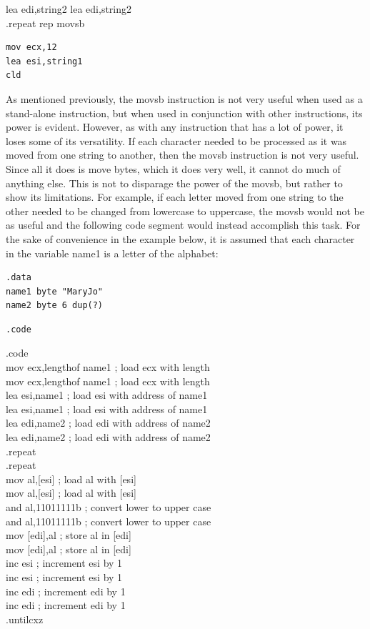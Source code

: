 \documentclass[10pt]{article}
\begin{document}
lea edi,string2 lea edi,string2\\
.repeat rep movsb

\begin{verbatim}
mov ecx,12
lea esi,string1
cld
\end{verbatim}

As mentioned previously, the movsb instruction is not very useful when used as a stand-alone instruction, but when used in conjunction with other instructions, its power is evident. However, as with any instruction that has a lot of power, it loses some of its versatility. If each character needed to be processed as it was moved from one string to another, then the movsb instruction is not very useful. Since all it does is move bytes, which it does very well, it cannot do much of anything else. This is not to disparage the power of the movsb, but rather to show its limitations. For example, if each letter moved from one string to the other needed to be changed from lowercase to uppercase, the movsb would not be as useful and the following code segment would instead accomplish this task. For the sake of convenience in the example below, it is assumed that each character in the variable name1 is a letter of the alphabet:

\begin{verbatim}
.data
name1 byte "MaryJo"
name2 byte 6 dup(?)
\end{verbatim}

\begin{verbatim}
.code
\end{verbatim}

.code\\
mov ecx,lengthof name1 ; load ecx with length\\
mov ecx,lengthof name1 ; load ecx with length\\
lea esi,name1 ; load esi with address of name1\\
lea esi,name1 ; load esi with address of name1\\
lea edi,name2 ; load edi with address of name2\\
lea edi,name2 ; load edi with address of name2\\
.repeat\\
.repeat\\[0pt]
mov al,[esi] ; load al with [esi]\\[0pt]
mov al,[esi] ; load al with [esi]\\
and al,11011111b ; convert lower to upper case\\
and al,11011111b ; convert lower to upper case\\[0pt]
mov [edi],al ; store al in [edi]\\[0pt]
mov [edi],al ; store al in [edi]\\
inc esi ; increment esi by 1\\
inc esi ; increment esi by 1\\
inc edi ; increment edi by 1\\
inc edi ; increment edi by 1\\
.untilcxz
\end{document}
